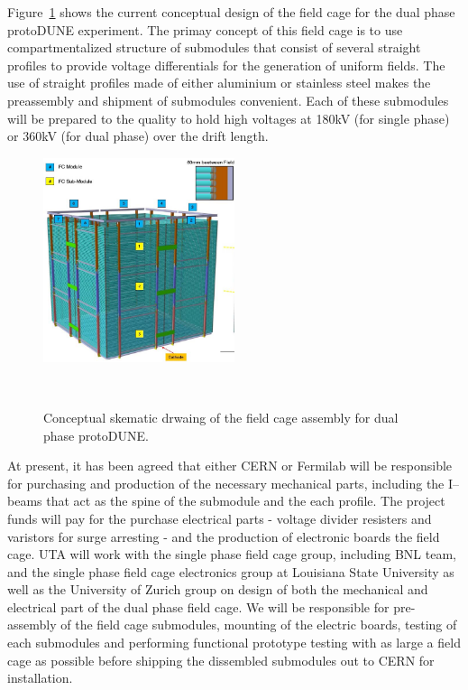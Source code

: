 Figure~\ref{fig:if-dp-fc} shows the current conceptual design of the field cage for the dual phase protoDUNE experiment.   The primay concept of this field cage is to use compartmentalized structure of submodules that consist of several straight profiles to provide voltage differentials for the generation of uniform fields.   The use of straight profiles made of either aluminium or stainless steel makes the preassembly and shipment of submodules convenient.   Each of these submodules will be prepared to the quality to hold high voltages at 180kV (for single phase) or  360kV (for dual phase) over the drift length.  
\begin{figure}[htb]
\centering
\includegraphics[width=0.50\textwidth]{images/if-dp-fc.jpg}
\caption[]{Conceptual skematic drwaing of the field cage assembly for dual phase protoDUNE.}
~\label{fig:if-dp-fc}
\end{figure}

At present, it has been agreed that either CERN or Fermilab will be responsible for purchasing and production of the necessary mechanical parts, including the I--beams that act as the spine of the submodule and the each profile.  The project funds will pay for the purchase electrical parts - voltage divider resisters and varistors for surge arresting - and the production of electronic boards the field cage.  UTA will work with the single phase field cage group, including BNL team, and the single phase field cage electronics group at Louisiana State University as well as the University of Zurich group on design of both the mechanical and electrical part of the dual phase field cage.   We will be responsible for pre-assembly of the field cage submodules, mounting of the electric boards, testing of each submodules and performing functional prototype testing with as large a field cage as possible before shipping the dissembled submodules out to CERN for installation.

